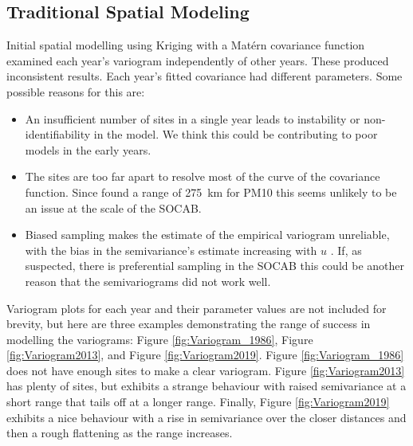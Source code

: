 \documentclass{article}
\begin{document}
\subsection{Traditional Spatial Modeling}
\label{subsec:tradspatmod}
Initial spatial modelling using Kriging with a Mat\'{e}rn covariance function examined each year's variogram independently of other years. These produced inconsistent results.  Each year's fitted covariance had different parameters.  Some possible reasons for this are:
\begin{itemize}
	\item An insufficient number of sites in a single year leads to instability or non-identifiability in the model.  We think this could be contributing to poor models in the early years.
	\item The sites are too far apart to resolve most of the curve of the covariance function. Since \cite{cameletti2011spatio} found a range of 275 km for \ac{PM10} this seems unlikely to be an issue at the scale of the \ac{SOCAB}.
	\item Biased sampling makes the estimate of the empirical variogram unreliable, with the bias in the semivariance's estimate increasing with $u$ \citep{diggle:07}.  If, as suspected, there is preferential sampling in the \ac{SOCAB} this could be another reason that the semivariograms did not work well.
\end{itemize}

Variogram plots for each year and their parameter values are not 
included for brevity, 
but here are three examples demonstrating the range of success in modelling the variograms: Figure \ref{fig:Variogram_1986}, Figure \ref{fig:Variogram2013}, and Figure \ref{fig:Variogram2019}.  Figure  \ref{fig:Variogram_1986} does not have enough sites to make a clear variogram.  Figure  \ref{fig:Variogram2013} has plenty of sites, but exhibits a strange behaviour with raised semivariance at a short range that tails off at a longer range.  Finally, Figure  \ref{fig:Variogram2019} exhibits a nice behaviour with a rise in semivariance over the closer distances and then a rough flattening as the range increases.  
\end{document}
